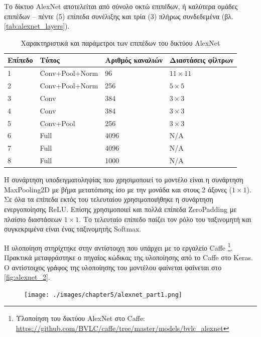 Το δίκτυο AlexNet αποτελείται από σύνολο οκτώ επιπέδων,
ή καλύτερα ομάδες επιπέδων – πέντε (5) επίπεδα συνέλιξης και τρία (3) πλήρως
συνδεδεμένα (βλ. \autoref{tab:alexnet_layers}).

\begin{table}[H]
  \begin{center}
    \caption{Χαρακτηριστικά και παράμετροι των επιπέδων του δικτύου AlexNet}
    \label{tab:alexnet_layers}
    \begin{tabular}{ | l | l | l | l | }
      \hline
      \rowcolor{Gray}
      Επίπεδο  & Τύπος & Αριθμός καναλιών & Διαστάσεις φίλτρων \\
      \hline
      1 & Conv+Pool+Norm & 96 & $11 \times 11$ \\
      2 & Conv+Pool+Norm & 256 & $5 \times 5$ \\
      3 & Conv & 384 & $3 \times 3$ \\
      4 & Conv & 384 & $3 \times 3$ \\
      5 & Conv+Pool & 256 & $3 \times 3$ \\
      6 & Full & 4096 & Ν/A \\
      7 & Full & 4096 & N/A \\
      8 & Full & 1000 & N/A \\
      \hline
    \end{tabular}
  \end{center}
\end{table}


Η συνάρτηση υποδειγματοληψίας που χρησιμοποιεί το μοντέλο είναι η συνάρτηση
MaxPooling2D με βήμα μετατόπισης ίσο με την μονάδα και στους 2 άξονες ($1 \times 1$).
Σε όλα τα επίπεδα εκτός του τελευταίου χρησιμοποιήθηκε η συνάρτηση ενεργοποίησης
ReLU. Επίσης χρησιμοποιεί και πολλά επίπεδα ZeroPadding με πλαίσιο
διαστάσεων $1 \times 1$. Το τελευταίο επίπεδο παίζει τον ρόλο του ταξινομητή και συγκεκριμένα
είναι ένας ταξινομητής Softmax.

Η υλοποίηση στηρίχτηκε στην αντίστοιχη που υπάρχει με το εργαλείο Caffe
\footnote{Υλοποίηση του δικτύου AlexNet στο Caffe: \url{https://github.com/BVLC/caffe/tree/master/models/bvlc_alexnet}}.
Πρακτικά μεταφράστηκε ο πηγαίος κώδικας της υλοποίησης από το Caffe στο Keras.
Ο αντίστοιχος γράφος της υλοποίησης του μοντέλου
φαίνεται φαίνεται στο \autoref{fig:alexnet_2}.


\begin{figure}[H]
  \centering
  \texttt{[image: ./images/chapter5/alexnet\_part1.png]}
\end{figure}

